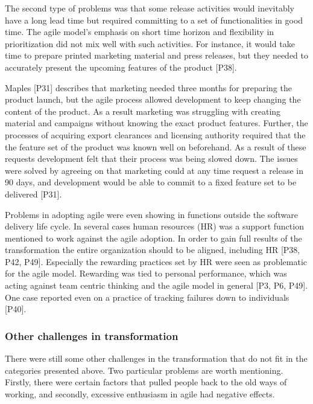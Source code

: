\documentclass[preprint,authoryear,12pt]{elsarticle}
\begin{document}
The second type of problems was that some release activities would inevitably
have a long lead time but required committing to a set of functionalities in
good time. The agile model's emphasis on short time horizon and flexibility in
prioritization did not mix well with such activities.
For instance, it would take time to prepare printed marketing material and press
releases, but they needed to accurately present the upcoming features of the
product [P38].

Maples [P31] describes that marketing needed three months for preparing the
product launch, but the agile process allowed development to keep changing the
content of the product. As a result marketing was struggling with creating
material and campaigns without knowing the exact product features. Further, the
processes of acquiring export clearances and licensing authority required that
the the feature set of the product was known well on beforehand.
As a result of these requests development felt that their process was being
slowed down. The issues were solved by agreeing on that marketing could at any
time request a release in 90 days, and development would be able to commit to a
fixed feature set to be delivered [P31].


Problems in adopting agile were even showing in functions outside the software
delivery life cycle. In several cases human resources (HR) was a support function
mentioned to work against the agile adoption. In order to gain full results of
the transformation the entire organization should to be aligned, including HR
[P38, P42, P49].
Especially the rewarding practices set by HR were seen as problematic for the
agile model. Rewarding was tied to personal performance, which was acting
against team centric thinking and the agile model in general [P3, P6, P49].
One case reported even on a practice of tracking failures down to individuals
[P40].


\subsubsection{Other challenges in transformation}

There were still some other challenges in the transformation that do not fit in
the categories presented above. Two particular problems are worth mentioning.
Firstly, there were certain factors that pulled people back to the old ways of
working, and secondly, excessive enthusiasm in agile had negative effects.
\end{document}
